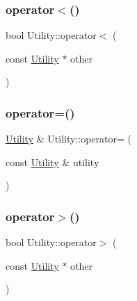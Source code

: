 \subsubsection{\texorpdfstring{operator$<$()}{operator<()}}
{\footnotesize\ttfamily bool Utility\+::operator$<$ (\begin{DoxyParamCaption}\item[{const \mbox{\hyperlink{classUtility}{Utility}} $\ast$}]{other }\end{DoxyParamCaption})}

\mbox{\label{classUtility_a9bf6f9126779f4035fccbd35333de575_a9bf6f9126779f4035fccbd35333de575}} 
\subsubsection{\texorpdfstring{operator=()}{operator=()}}
{\footnotesize\ttfamily \mbox{\hyperlink{classUtility}{Utility}} \& Utility\+::operator= (\begin{DoxyParamCaption}\item[{const \mbox{\hyperlink{classUtility}{Utility}} \&}]{utility }\end{DoxyParamCaption})}

\mbox{\label{classUtility_a222897e8c338fde0d754df4683fbc89b_a222897e8c338fde0d754df4683fbc89b}} 
\subsubsection{\texorpdfstring{operator$>$()}{operator>()}}
{\footnotesize\ttfamily bool Utility\+::operator$>$ (\begin{DoxyParamCaption}\item[{const \mbox{\hyperlink{classUtility}{Utility}} $\ast$}]{other }\end{DoxyParamCaption})}

\mbox{\label{classUtility_a01ec91140b9d23bf5b03e0fc55bced0d_a01ec91140b9d23bf5b03e0fc55bced0d}} 
